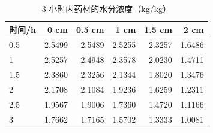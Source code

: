 \begin{table}[H]
  \centering
  \caption{3 小时内药材的水分浓度（kg/kg）}
  \label{tab:p2C}
  \footnotesize
  \begin{tabular}{@{}lrrrrr@{}}
    \toprule
    时间/h & 0 cm & 0.5 cm & 1 cm & 1.5 cm & 2 cm \\
    \midrule
    0.5 & 2.5499 & 2.5489 & 2.5255 & 2.3257 & 1.6486 \\
    1 & 2.5257 & 2.4948 & 2.3578 & 2.0230 & 1.4711 \\
    1.5 & 2.3860 & 2.3256 & 2.1344 & 1.8020 & 1.3476 \\
    2 & 2.1708 & 2.1084 & 1.9236 & 1.6259 & 1.2311 \\
    2.5 & 1.9567 & 1.9006 & 1.7360 & 1.4720 & 1.1166 \\
    3 & 1.7662 & 1.7165 & 1.5702 & 1.3333 & 1.0081 \\
    \bottomrule
  \end{tabular}
\end{table}
